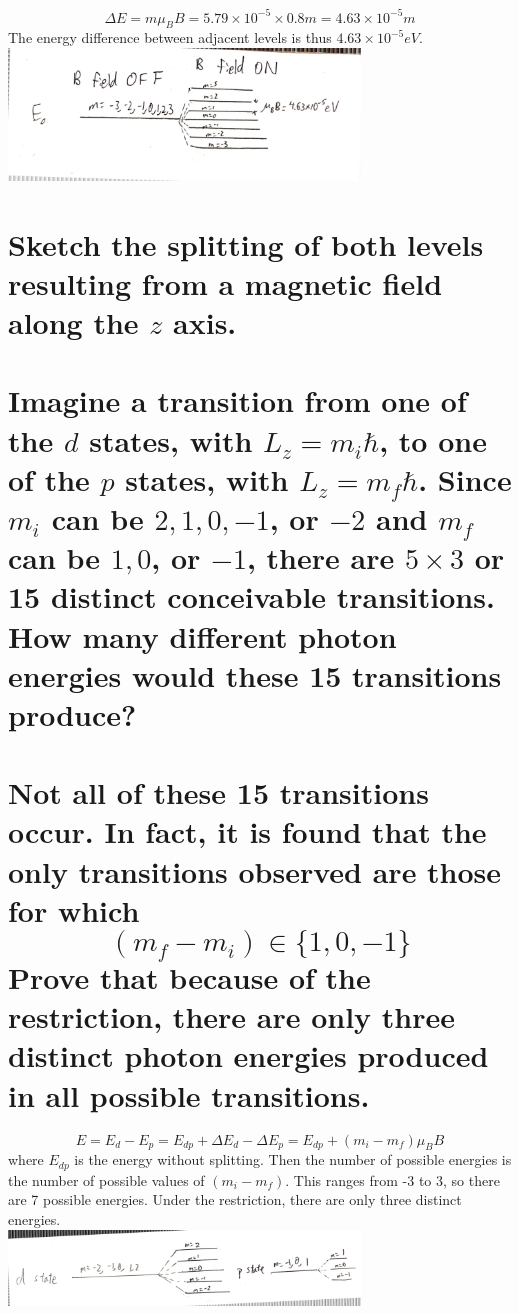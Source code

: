 \documentclass[answers]{exam}
\begin{document}
\begin{questions}
\begin{solution}
	$$\Delta E = m\mu_BB = 5.79\times10^{-5}\times 0.8m = 4.63\times10^{-5}m$$
	The energy difference between adjacent levels is thus $4.63\times10^{-5}\unit{eV}$. \\
	\includegraphics[width=0.7\textwidth]{q-3.pdf}
\end{solution}


\begin{parts}
\part{Sketch the splitting of both levels resulting from a magnetic field along the $z$ axis.}
\part{Imagine a transition from one of the $d$ states, with $L_z=m_i\hbar$, to one of the $p$ states, with $L_z=m_f\hbar$. Since $m_i$ can be $2,1,0,-1$, or $-2$ and $m_f$ can be $1,0$, or $-1$, there are $5\times3$ or 15 distinct conceivable transitions. How many different photon energies would these 15 transitions produce?}
\part{Not all of these 15 transitions occur. In fact, it is found that the only transitions observed are those for which
	$$(m_f-m_i) \in \{1,0,-1\}$$
Prove that because of the restriction, there are only three distinct photon energies produced in all possible transitions.}
\end{parts}

\begin{solution}
	$$E = E_d - E_p = E_{dp} + \Delta E_d - \Delta E_p = E_{dp} + (m_i-m_f) \mu_BB$$
	where $E_{dp}$ is the energy without splitting. Then the number of possible energies is the number of possible values of $(m_i-m_f)$. This ranges from -3 to 3, so there are 7 possible energies. Under the restriction, there are only three distinct energies. \\
	\includegraphics[width=0.7\textwidth]{q-2.pdf}
\end{solution}


\end{questions}
\end{document}

